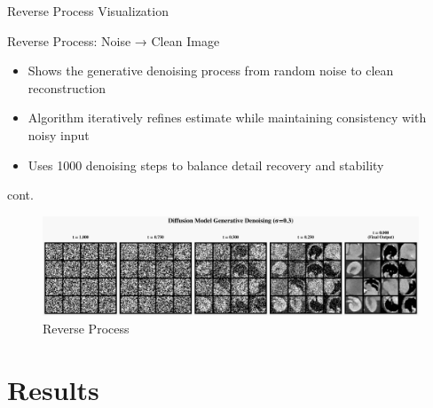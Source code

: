 \documentclass[10pt]{beamer}
\begin{document}
\begin{frame}{Reverse Process Visualization}
  \centering

  \begin{alertblock}{Reverse Process: Noise → Clean Image}
    \begin{itemize}\itemsep -0.1cm
      \item Shows the generative denoising process from random noise to clean reconstruction
      \item Algorithm iteratively refines estimate while maintaining consistency with noisy input
      \item Uses 1000 denoising steps to balance detail recovery and stability
    \end{itemize}
  \end{alertblock}
\end{frame}

\begin{frame}{cont.}
  \centering
  \begin{figure}
      \includegraphics[width=\linewidth]{reverse_process_snapshots.png}
      \caption{Reverse Process}
  \end{figure}
\end{frame}

\section{Results}
\end{document}
